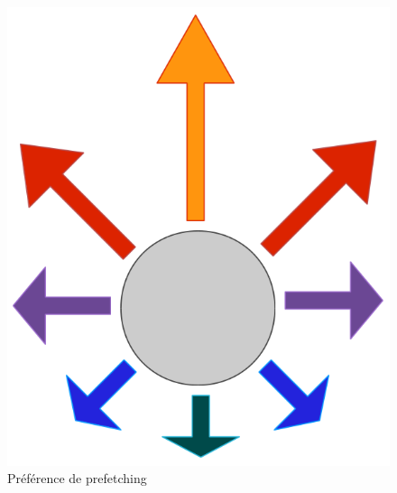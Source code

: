 	\begin{figure}[!h]
        \centering
        \includegraphics[scale=0.30]{./Ressources/Images/prefetchSol.png}
        \caption{Préférence de prefetching}
        \label{PrefetchSol}
        \end{figure}

